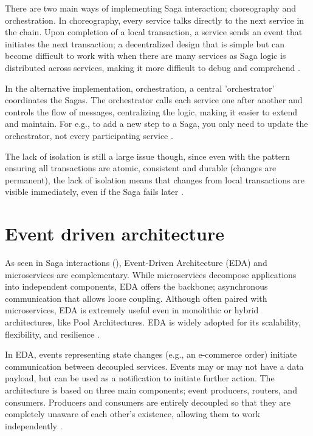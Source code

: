 \documentclass[]{final}
\begin{document}
There are two main ways of implementing Saga interaction; choreography and
orchestration. In choreography, every service talks directly to the next
service in the chain. Upon completion of a local transaction, a service sends
an event that initiates the next transaction; a decentralized design that is
simple but can become difficult to work with when there are many services
as Saga logic is distributed across services, making it more difficult
to debug and comprehend \cite{noauthor_saga_nodate}.

In the alternative implementation, orchestration, a central ’orchestrator’
coordinates the Sagas. The orchestrator calls each service one after another
and controls the flow of messages, centralizing the logic, making it easier
to extend and maintain. For e.g., to add a new step to a Saga, you only need
to update the orchestrator, not every participating service \cite{noauthor_saga_nodate}.

The lack of isolation is still a large issue though, since even with the
pattern ensuring all transactions are atomic, consistent and durable
(changes are permanent), the lack of isolation means that changes from local
transactions are visible immediately, even if the Saga fails later \cite{noauthor_saga_nodate}.

\section{Event driven architecture}

As seen in Saga interactions {\hypersetup{linkcolor=teal}(\pageref{saga_events})},
Event-Driven Architecture (EDA) and microservices are complementary. While
microservices decompose applications into independent components, EDA offers
the backbone; asynchronous communication that allows loose coupling. Although
often paired with microservices, EDA is extremely useful even in monolithic or
hybrid architectures, like Pool Architectures. EDA is widely adopted for its
scalability, flexibility, and resilience \cite{noauthor_event-driven_nodate}.

In EDA, events representing state changes (e.g., an e-commerce order) initiate
communication between decoupled services. Events may or may not have a data
payload, but can be used as a notification to initiate further action. The
architecture is based on three main components; event producers, routers, and
consumers. Producers and consumers are entirely decoupled so that they are
completely unaware of each other’s existence, allowing them to work
independently \cite{noauthor_event-driven_nodate}.
\end{document}
